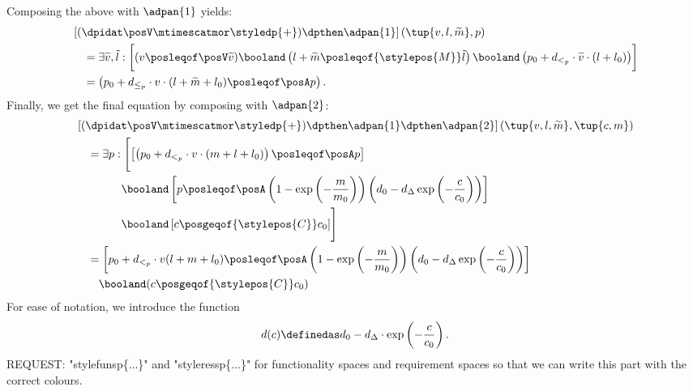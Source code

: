 {\begin{example}
    Composing the above with $\adpan{1}$ yields:  
    \begin{align}
        &\left[(\dpidat\posV \mtimescatmor \styledp{+})\dpthen \adpan{1}\right]\left(\tup{v, l , \widetilde{m}}, p\right) \notag\\
        & \quad = \exists \widetilde{v}, \tilde{l}:\bigg[(v \posleqof\posV \widetilde{v})\booland\left(l + \widetilde{m} \posleqof{\stylepos{M}} \tilde{l} \right) \booland\left(p_0 + d_{<_p} \cdot \widetilde{v} \cdot (l + l_0) \right)\biggr]\\
        &\quad = \left(p_0 + d_{\le_p} \cdot v \cdot (l + \widetilde{m} + l_0) \posleqof\posA  p\right)
    .\end{align} 
    Finally, we get the final equation by composing with $\adpan{2}$: 
    \begin{alignat}{2}
        & \left[(\dpidat\posV \mtimescatmor \styledp{+})\dpthen \adpan{1} \dpthen \adpan{2}\right] \left( \tup{v, l,\widetilde{m}}, \tup{c,m}\right) \\
        &\quad  = \exists p : \Biggl[\left[\left( p_0 + d_{<_p} \cdot v \cdot(m + l + l_0) \right) \posleqof\posA p\right] \notag \\
        & \qquad\qquad\booland  \left[ p \posleqof\posA \left(1 - \exp\left(-\frac{m}{m_0}\right)\right)\left(d_0 - d_\Delta \exp\left(-\frac{c}{c_0}\right)\right)\right] \notag \\
        & \qquad\qquad \booland \left[ c \posgeqof{\stylepos{C}} c_0\right]\Biggr]\\
        & \quad = \left[p_0 + d_{<_p}\cdot v (l + m + l_0) \posleqof\posA \left(1 - \exp\left(-\frac{m}{m_0}\right)\right) \left(d_0 - d_\Delta \exp\left( - \frac{c}{c_0}\right)\right)\right] \notag \\
        & \qquad \booland (c \posgeqof{\stylepos{C}}c_0)
    \end{alignat}
    For ease of notation, we introduce the function
    \begin{equation}
        d(c) \definedas d_0 - d_\Delta \cdot \exp\left(-\frac{c}{c_0}\right)
    .\end{equation}
    REQUEST: "stylefunsp\{...\}" and "styleressp\{...\}" for functionality spaces and requirement spaces so that we can write this part with the correct colours.


\end{example}}

